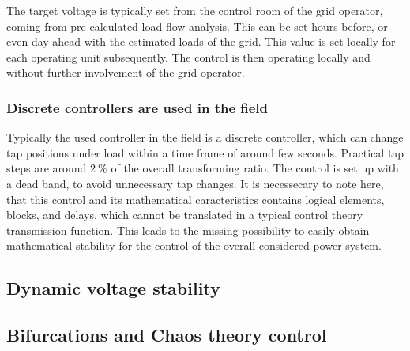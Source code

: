 The target voltage is typically set from the control room of the grid operator, coming from pre-calculated load flow analysis. This can be set hours before, or even day-ahead with the estimated loads of the grid. This value is set locally for each operating unit subsequently. The control is then operating locally and without further involvement of the grid operator. 


\subsubsection{Discrete controllers are used in the field}

Typically the used controller in the field is a discrete controller, which can change tap positions under load within a time frame of around few seconds. Practical tap steps are around $2~\mathrm{\%}$ of the overall transforming ratio. The control is set up with a dead band, to avoid unnecessary tap changes. It is necessecary to note here, that this control and its mathematical caracteristics contains logical elements, blocks, and delays, which cannot be translated in a typical control theory transmission function. This leads to the missing possibility to easily obtain mathematical stability for the control of the overall considered power system.


\subsection{Dynamic voltage stability}


\subsection{Bifurcations and Chaos theory control}

